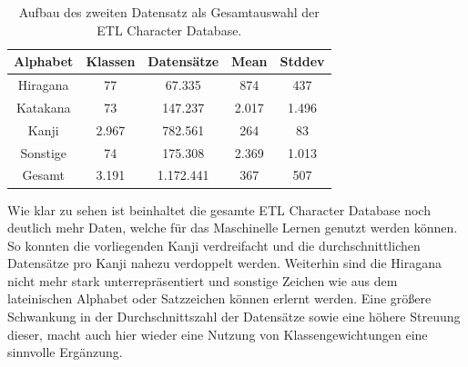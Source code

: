\documentclass[twoside,a4paper]{IEEEtran}
\begin{document}
\begin{table}[!htb]
	\caption{Aufbau des zweiten Datensatz als Gesamtauswahl der ETL Character Database.}
	\label{data_total}
	\centering
	\begin{tabular}{|c|c|c|c|c|}
		\hline
		Alphabet & Klassen & Datensätze & Mean & Stddev\\
		\hline
		\hline
		Hiragana & 77 & 67.335 & 874 & 437\\
		\hline 
		Katakana & 73 & 147.237 & 2.017 & 1.496\\
		\hline
		Kanji & 2.967 & 782.561 & 264 & 83\\
		\hline
		Sonstige & 74 & 175.308 & 2.369 & 1.013\\
		\hline
		\hline
		Gesamt & 3.191 & 1.172.441 & 367 & 507\\
		\hline
	\end{tabular}
\end{table}
Wie klar zu sehen ist beinhaltet die gesamte ETL Character Database noch deutlich mehr Daten, welche für das Maschinelle Lernen genutzt werden können. So konnten die vorliegenden Kanji verdreifacht und die durchschnittlichen Datensätze pro Kanji nahezu verdoppelt werden. Weiterhin sind die Hiragana nicht mehr stark unterrepräsentiert und sonstige Zeichen wie aus dem lateinischen Alphabet oder Satzzeichen können erlernt werden. Eine größere Schwankung in der Durchschnittszahl der Datensätze sowie eine höhere Streuung dieser, macht auch hier wieder eine Nutzung von Klassengewichtungen eine sinnvolle Ergänzung.
\end{document}
